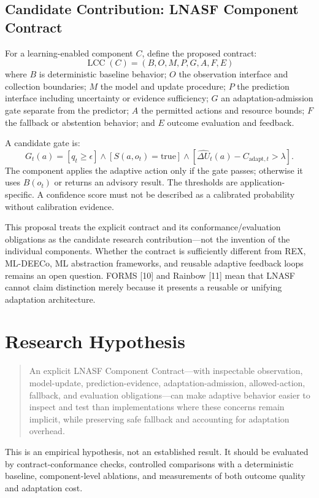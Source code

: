 \documentclass[11pt,a4paper]{article}
\begin{document}
\subsection{Candidate Contribution: LNASF Component Contract}
For a learning-enabled component $C$, define the proposed contract:
\[
\operatorname{LCC}(C) = (B,O,M,P,G,A,F,E)
\]
where $B$ is deterministic baseline behavior; $O$ the observation interface and collection boundaries; $M$ the model and update procedure; $P$ the prediction interface including uncertainty or evidence sufficiency; $G$ an adaptation-admission gate separate from the predictor; $A$ the permitted actions and resource bounds; $F$ the fallback or abstention behavior; and $E$ outcome evaluation and feedback.

A candidate gate is:
\[
G_t(a) =
[q_t \geq \epsilon]
\land [S(a,o_t)=\mathrm{true}]
\land [\widehat{\Delta U}_t(a)-C_{\mathrm{adapt},t}>\lambda].
\]
The component applies the adaptive action only if the gate passes; otherwise it uses $B(o_t)$ or returns an advisory result. The thresholds are application-specific. A confidence score must not be described as a calibrated probability without calibration evidence.

This proposal treats the explicit contract and its conformance/evaluation obligations as the candidate research contribution—not the invention of the individual components. Whether the contract is sufficiently different from REX, ML-DEECo, ML abstraction frameworks, and reusable adaptive feedback loops remains an open question. FORMS [10] and Rainbow [11] mean that LNASF cannot claim distinction merely because it presents a reusable or unifying adaptation architecture.

\section{Research Hypothesis}
\begin{quote}
An explicit LNASF Component Contract---with inspectable observation, model-update, prediction-evidence, adaptation-admission, allowed-action, fallback, and evaluation obligations---can make adaptive behavior easier to inspect and test than implementations where these concerns remain implicit, while preserving safe fallback and accounting for adaptation overhead.
\end{quote}
This is an empirical hypothesis, not an established result. It should be evaluated by contract-conformance checks, controlled comparisons with a deterministic baseline, component-level ablations, and measurements of both outcome quality and adaptation cost.
\end{document}

